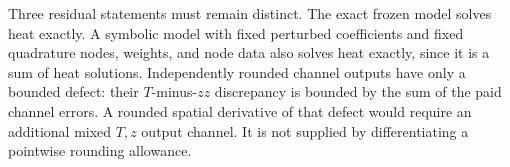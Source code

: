 Three residual statements must remain distinct.
The exact frozen model solves heat exactly.
A symbolic model with fixed perturbed coefficients and fixed
quadrature nodes, weights, and node data also solves heat
exactly, since it is a sum of heat solutions.
Independently rounded channel outputs have only a bounded
defect: their \(T\)-minus-\(zz\) discrepancy is bounded by
the sum of the paid channel errors.
A rounded spatial derivative of that defect would require
an additional mixed \(T,z\) output channel. It is not supplied
by differentiating a pointwise rounding allowance.
